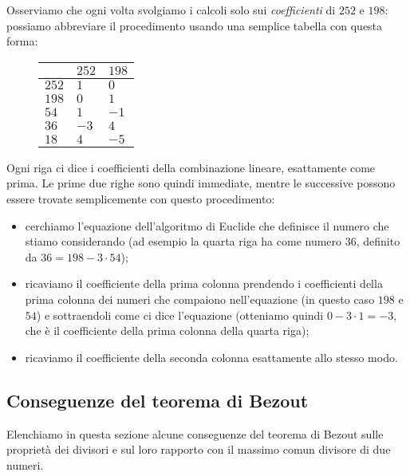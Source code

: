 \begin{example}
    Osserviamo che ogni volta svolgiamo i calcoli solo sui \emph{coefficienti} di $252$ e $198$: possiamo abbreviare il procedimento usando una semplice tabella con questa forma:
    \begin{figure}[H]
            \centering
            \begin{tabular}{l|ll}
                       & $252$  & $198$ \\ \hline
                $252$  & $1$    & $0$   \\
                $198$  & $0$    & $1$   \\
                $54$   & $1$    & $-1$  \\
                $36$   & $-3$   & $4$   \\
                $18$   & $4$    & $-5$
            \end{tabular}
    \end{figure}
    Ogni riga ci dice i coefficienti della combinazione lineare, esattamente come prima. Le prime due righe sono quindi immediate, mentre le successive possono essere trovate semplicemente con questo procedimento:
    \begin{itemize}
        \item cerchiamo l'equazione dell'algoritmo di Euclide che definisce il numero che stiamo considerando (ad esempio la quarta riga ha come numero $36$, definito da $36 = 198 - \boxed 3 \cdot 54$);
        \item ricaviamo il coefficiente della prima colonna prendendo i coefficienti della prima colonna dei numeri che compaiono nell'equazione (in questo caso $198$ e $54$) e sottraendoli come ci dice l'equazione (otteniamo quindi $0 - \boxed 3 \cdot 1 = -3$, che è il coefficiente della prima colonna della quarta riga);
        \item ricaviamo il coefficiente della seconda colonna esattamente allo stesso modo.
    \end{itemize}
\end{example}

\subsection{Conseguenze del teorema di Bezout}

Elenchiamo in questa sezione alcune conseguenze del teorema di Bezout sulle proprietà dei divisori e sul loro rapporto con il massimo comun divisore di due numeri.

